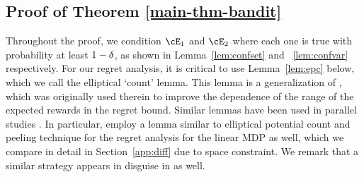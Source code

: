 \documentclass{article}
\begin{document}
\subsection{Proof of Theorem \ref{main-thm-bandit}}
\label{subsec:proof-voful2}

Throughout the proof, we condition $\cE_1$ and $\cE_2$ where each one is true with probability at least $1-{\delta}$, as shown in Lemma~\ref{lem:confset} and ~\ref{lem:confvar} respectively.
For our regret analysis, it is critical to use Lemma~\ref{lem:epc} below, which we call the elliptical `count' lemma.
This lemma is a generalization of \citet[Exercise 19.3]{lattimore20bandit}, which was originally used therein to improve the dependence of the range of the expected rewards in the regret bound.
Similar lemmas have been used in parallel studies \cite{he2021logarithmic,wagenmaker2022first}.
In particular, \citet{he2021logarithmic} employ a lemma similar to elliptical potential count and peeling technique for the regret analysis for the linear MDP as well, which we compare in detail in Section~\ref{app:diff} due to space constraint.
We remark that a similar strategy appears in disguise in \citet[Proposition 3]{russo13eluder} as well.
\end{document}
